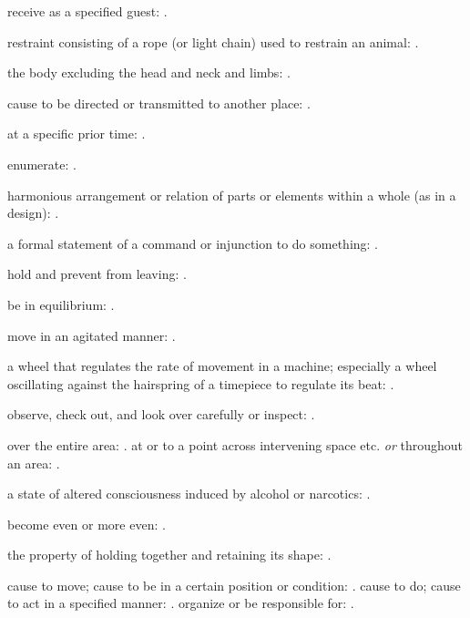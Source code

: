   receive as a specified guest: .

  restraint consisting of a rope (or light chain) used to restrain an animal:   .

  the body excluding the head and neck and limbs:   .

  cause to be directed or transmitted to another place:   .

  at a specific prior time: .

  enumerate:   .

  harmonious arrangement or relation of parts or elements within a whole (as in a design):   .

  a formal statement of a command or injunction to do something:   .

  hold and prevent from leaving: .

  be in equilibrium: .

  move in an agitated manner: .

  a wheel that regulates the rate of movement in a machine; especially a wheel oscillating against the hairspring of a timepiece to regulate its beat:   .

  observe, check out, and look over carefully or inspect:   .

  over the entire area:   . at or to a point across intervening space etc. \textit{or} throughout an area: .

  a state of altered consciousness induced by alcohol or narcotics: .

  become even or more even:   .

  the property of holding together and retaining its shape:   .

  cause to move; cause to be in a certain position or condition:   . cause to do; cause to act in a specified manner:   . organize or be responsible for:   .

